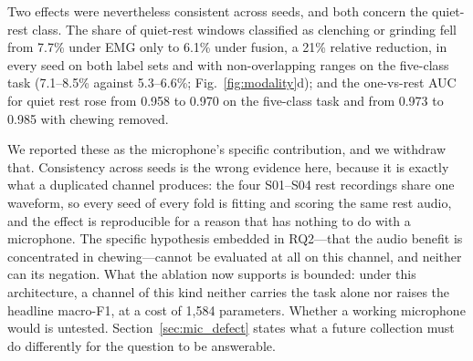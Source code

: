\documentclass[pdflatex,sn-nature,iicol]{sn-jnl}
\begin{document}
Two effects were nevertheless consistent across seeds, and both concern the quiet-rest class. The share of quiet-rest windows classified as clenching or grinding fell from 7.7\% under EMG only to 6.1\% under fusion, a 21\% relative reduction, in every seed on both label sets and with non-overlapping ranges on the five-class task (7.1--8.5\% against 5.3--6.6\%; Fig.~\ref{fig:modality}d); and the one-vs-rest AUC for quiet rest rose from 0.958 to 0.970 on the five-class task and from 0.973 to 0.985 with chewing removed.

We reported these as the microphone's specific contribution, and we withdraw that. Consistency across seeds is the wrong evidence here, because it is exactly what a duplicated channel produces: the four S01--S04 rest recordings share one waveform, so every seed of every fold is fitting and scoring the same rest audio, and the effect is reproducible for a reason that has nothing to do with a microphone. The specific hypothesis embedded in RQ2---that the audio benefit is concentrated in chewing---cannot be evaluated at all on this channel, and neither can its negation. What the ablation now supports is bounded: under this architecture, a channel of this kind neither carries the task alone nor raises the headline macro-F1, at a cost of 1,584 parameters. Whether a working microphone would is untested. Section~\ref{sec:mic_defect} states what a future collection must do differently for the question to be answerable.
\end{document}
